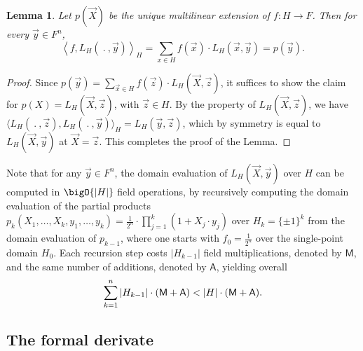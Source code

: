 \documentclass[11pt]{article}
\newtheorem{lem}[]{Lemma}
\theoremstyle{definition}
\theoremstyle{remark}
\begin{document}
\begin{lem}
\label{lem:Lagrange}
Let $p(\vec X)$ be the unique multilinear extension of $f: H\rightarrow F$. 
Then for every $\vec y\in F^n$,
\begin{equation}
\label{e:LagrangeScalarProduct}
\left\langle f ,L_H(\:.\:, \vec y)\right\rangle_H = \sum_{x\in H} f(\vec x) \cdot L_H(\vec x, \vec y) = p(\vec y).
\end{equation}
\end{lem}
\begin{proof}
Since $p(\vec y) = \sum_{\vec x\in H} f(\vec z)\cdot L_H(\vec X,\vec z)$, it suffices to show the claim for $p(X) = L_H(\vec X,\vec z)$, with $\vec z\in H$.
By the property of $L_H(\vec X,\vec z)$, we have $\big\langle L_H(\:.\:, \vec z), L_H(\:.\:,\vec y) \big\rangle_H =L_H(\vec y,\vec z)$, which by symmetry is equal to $L_H(\vec X,\vec y)$ at $\vec X=\vec z$.
This completes the proof of the Lemma.
\end{proof}


Note that for any $\vec y\in F^n$, the domain evaluation of $L_H(\vec X, \vec y)$ over $H$ can be computed in 
$\bigO{|H|}$ field operations, by recursively computing the domain evaluation of the partial products 
$
p_k(X_1,\ldots, X_k, y_1,\ldots, y_k)= \frac{1}{2^n}\cdot \prod_{j=1}^k (1 + X_j\cdot y_j)
$ 
over $H_k =\{\pm 1\}^k$ from the domain evaluation of $p_{k-1}$, where one starts with $f_0 = \frac{1}{2^n}$ over the single-point domain $H_0$.
Each recursion step costs $|H_{k-1}|$ field multiplications, denoted by $\mathsf M$, and the same number of additions, denoted by $\mathsf A$,  yielding overall
\begin{equation}
\label{e:lagrange:cost}
\sum_{k=1}^{n} |H_{k-1}| \cdot (\textsf M + \textsf A) < |H| \cdot  (\textsf M + \textsf A).
\end{equation}


\subsection{The formal derivate}
\end{document}
